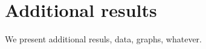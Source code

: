 \chapter{Additional results}
\label{chapter:additionalresults}

We present additional resuls, data, graphs, whatever.
